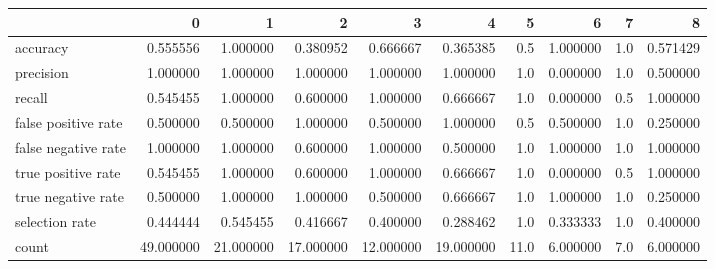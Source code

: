 \begin{tabular}{lrrrrrrrrr}
\toprule
{} &          0 &          1 &          2 &          3 &          4 &     5 &         6 &    7 &         8 \\
\midrule
accuracy            &   0.555556 &   1.000000 &   0.380952 &   0.666667 &   0.365385 &   0.5 &  1.000000 &  1.0 &  0.571429 \\
precision           &   1.000000 &   1.000000 &   1.000000 &   1.000000 &   1.000000 &   1.0 &  0.000000 &  1.0 &  0.500000 \\
recall              &   0.545455 &   1.000000 &   0.600000 &   1.000000 &   0.666667 &   1.0 &  0.000000 &  0.5 &  1.000000 \\
false positive rate &   0.500000 &   0.500000 &   1.000000 &   0.500000 &   1.000000 &   0.5 &  0.500000 &  1.0 &  0.250000 \\
false negative rate &   1.000000 &   1.000000 &   0.600000 &   1.000000 &   0.500000 &   1.0 &  1.000000 &  1.0 &  1.000000 \\
true positive rate  &   0.545455 &   1.000000 &   0.600000 &   1.000000 &   0.666667 &   1.0 &  0.000000 &  0.5 &  1.000000 \\
true negative rate  &   0.500000 &   1.000000 &   1.000000 &   0.500000 &   0.666667 &   1.0 &  1.000000 &  1.0 &  0.250000 \\
selection rate      &   0.444444 &   0.545455 &   0.416667 &   0.400000 &   0.288462 &   1.0 &  0.333333 &  1.0 &  0.400000 \\
count               &  49.000000 &  21.000000 &  17.000000 &  12.000000 &  19.000000 &  11.0 &  6.000000 &  7.0 &  6.000000 \\
\bottomrule
\end{tabular}
